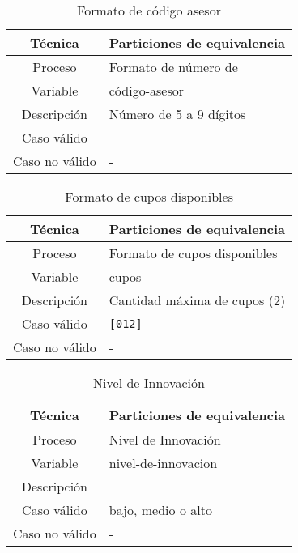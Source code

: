 \begin{table}[h!]
	\centering
	\begin{tabular}{|c|p{10cm}|}
		\hline
		\textbf{Técnica} & \textbf{Particiones de equivalencia} \\
		\hline
		Proceso          & Formato de número de                 \\
		\hline
		Variable         & código-asesor                        \\
		\hline
		Descripción      & Número de 5 a 9 dígitos              \\
		\hline
		Caso válido      &                                      \\
		\hline
		Caso no válido   & -                                    \\
		\hline
	\end{tabular}
	\caption{Formato de código asesor}
\end{table}

\begin{table}[h!]
	\centering
	\begin{tabular}{|c|p{10cm}|}
		\hline
		\textbf{Técnica} & \textbf{Particiones de equivalencia} \\
		\hline
		Proceso          & Formato de cupos disponibles         \\
		\hline
		Variable         & cupos                                \\
		\hline
		Descripción      & Cantidad máxima de cupos (2)         \\
		\hline
		Caso válido      & \texttt{[012]}                       \\
		\hline
		Caso no válido   & -                                    \\
		\hline
	\end{tabular}
	\caption{Formato de cupos disponibles}
\end{table}

\begin{table}[h!]
	\centering
	\begin{tabular}{|c|p{10cm}|}
		\hline
		\textbf{Técnica} & \textbf{Particiones de equivalencia} \\
		\hline
		Proceso          & Nivel de Innovación                  \\
		\hline
		Variable         & nivel-de-innovacion                  \\
		\hline
		Descripción      &                                      \\
		\hline
		Caso válido      & bajo, medio o alto                   \\
		\hline
		Caso no válido   & -                                    \\
		\hline
	\end{tabular}
	\caption{Nivel de Innovación}
\end{table}

